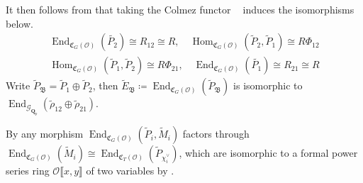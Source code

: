 \documentclass[leqno]{amsart}
\newcommand{\B}{\mathfrak B}
\newcommand{\fC}{\mathfrak{C}}
\DeclareMathOperator{\V}{\check{\mathbf{V}}} %
\newcommand{\Gp}{\mathcal{G}_{\Qp}} %
\newcommand{\Qp}{\mathbf{Q}_p}
\newcommand{\oo}{\mathcal{O}} %
\DeclareMathOperator{\End}{End}
\DeclareMathOperator{\Hom}{Hom}
\theoremstyle{definition}
\theoremstyle{remark}
\begin{document}
It then follows from \cite[Lem 8.10]{pask} that 
taking the Colmez functor 
$\V$ induces the isomorphisms below.
\begin{equation}\label{eq:end_deform}
\begin{split}
	\End_{\fC_{G}(\oo)}(\tilde{P_2})\cong R_{12}\cong R,\quad
	\Hom_{\fC_G(\oo)}(\tilde{P}_2, \tilde{P}_1)\cong R\Phi_{12}\\
	\Hom_{\fC_G(\oo)}(\tilde{P}_1, \tilde{P}_2)\cong R\Phi_{21},\quad
	\End_{\fC_{G}(\oo)}(\tilde{P_1})\cong R_{21}\cong R
\end{split}
\end{equation}
Write $ \tilde{P}_\B=\tilde{P}_1\oplus \tilde{P}_2$,
then $\tilde{E}_\B\coloneqq
\End_{\fC_G(\oo)}(\tilde{P}_\B)$
is isomorphic to 
$\End_{\Gp}(\tilde{\rho}_{12}\oplus \tilde{\rho}_{21})$.



By \cite[Prop 7.1]{pask}
any morphism 
$\End_{\fC_G(\oo)}(\tilde{P}_i, \tilde{M}_i)$
factors through
$\End_{\fC_G(\oo)}(\tilde{M}_i)\cong
\End_{\fC_T(\oo)}(\tilde{P}_{\chi_i^\vee})$,
which are isomorphic to
a formal power series ring
$ \oo\llbracket x,y\rrbracket$
of two variables
by \cite[Prop 3.34]{pask}.
\end{document}

